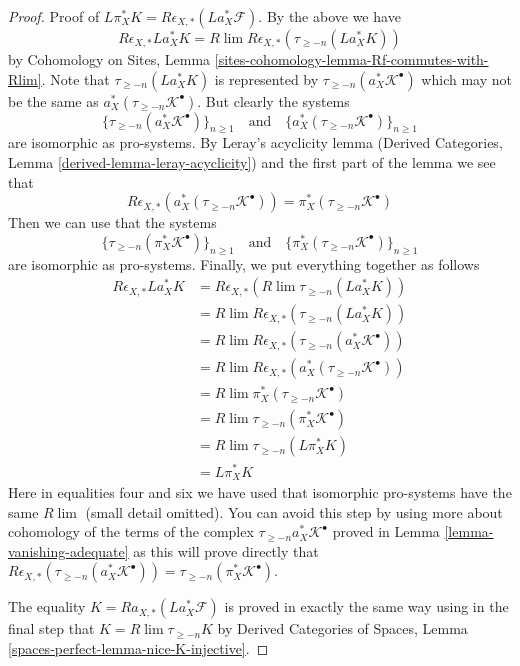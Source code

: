 \begin{proof}
\medskip\noindent
Proof of $L\pi_X^*K = R\epsilon_{X, *}(La_X^*\mathcal{F})$.
By the above we have
$$
R\epsilon_{X, *}La_X^*K =
R\lim R\epsilon_{X, *}(\tau_{\geq -n}(La_X^*K))
$$
by Cohomology on Sites, Lemma
\ref{sites-cohomology-lemma-Rf-commutes-with-Rlim}.
Note that $\tau_{\geq -n}(La_X^*K)$ is represented by
$\tau_{\geq -n}(a_X^*\mathcal{K}^\bullet)$ which may not be the
same as $a_X^*(\tau_{\geq -n}\mathcal{K}^\bullet)$.
But clearly the systems
$$
\{\tau_{\geq -n}(a_X^*\mathcal{K}^\bullet)\}_{n \geq 1}
\quad\text{and}\quad
\{a_X^*(\tau_{\geq -n}\mathcal{K}^\bullet)\}_{n \geq 1}
$$
are isomorphic as pro-systems.
By Leray's acyclicity lemma
(Derived Categories, Lemma \ref{derived-lemma-leray-acyclicity})
and the first part of the lemma we see that
$$
R\epsilon_{X, *}(a_X^*(\tau_{\geq -n}\mathcal{K}^\bullet)) =
\pi_X^*(\tau_{\geq -n}\mathcal{K}^\bullet)
$$
Then we can use that the systems
$$
\{\tau_{\geq -n}(\pi_X^*\mathcal{K}^\bullet)\}_{n \geq 1}
\quad\text{and}\quad
\{\pi_X^*(\tau_{\geq -n}\mathcal{K}^\bullet)\}_{n \geq 1}
$$
are isomorphic as pro-systems. Finally, we put everything together as follows
\begin{align*}
R\epsilon_{X, *}La_X^*K
& =
R\epsilon_{X, *} (R\lim \tau_{\geq -n}(La_X^*K)) \\
& =
R\lim R\epsilon_{X, *}(\tau_{\geq -n}(La_X^*K)) \\
& =
R\lim R\epsilon_{X, *}(\tau_{\geq -n}(a_X^*\mathcal{K}^\bullet)) \\
& =
R\lim R\epsilon_{X, *}(a_X^*(\tau_{\geq -n}\mathcal{K}^\bullet)) \\
& =
R\lim \pi_X^*(\tau_{\geq -n}\mathcal{K}^\bullet) \\
& =
R\lim \tau_{\geq -n}(\pi_X^*\mathcal{K}^\bullet) \\
& =
R\lim \tau_{\geq -n}(L\pi_X^*K) \\
& =
L\pi_X^*K
\end{align*}
Here in equalities four and six we have used that isomorphic
pro-systems have the same $R\lim$ (small detail omitted).
You can avoid this step by using more about cohomology of the terms
of the complex $\tau_{\geq -n}a_X^*\mathcal{K}^\bullet$ proved
in Lemma \ref{lemma-vanishing-adequate} as this will prove
directly that $R\epsilon_{X, *}(\tau_{\geq -n}(a_X^*\mathcal{K}^\bullet)) =
\tau_{\geq -n}(\pi_X^*\mathcal{K}^\bullet)$.

\medskip\noindent
The equality $K = Ra_{X, *}(La_X^*\mathcal{F})$ is
proved in exactly the same way using in the final step that
$K = R\lim \tau_{\geq -n}K$ by
Derived Categories of Spaces, Lemma \ref{spaces-perfect-lemma-nice-K-injective}.
\end{proof}








